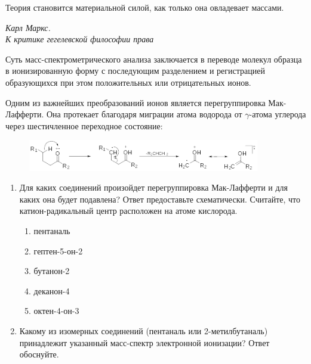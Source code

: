 

\hfill
\begin{minipage}{0.5\textwidth}
  \raggedleft
  Теория становится материальной силой, как только она овладевает массами.

  \textit{Карл Маркс.}\\
  \textit{К критике гегелевской философии права}
\end{minipage}

Суть масс-спектрометрического анализа заключается в переводе молекул образца в ионизированную форму с последующим разделением и регистрацией образующихся при этом положительных или отрицательных ионов.

Одним из важнейших преобразований ионов является перегруппировка
Мак-Лафферти. Она протекает благодаря миграции атома водорода
от $\gamma$-атома углерода через шестичленное переходное состояние:
\nopagebreak
\begin{figure}[H]
  \centering
  \includegraphics[width=0.9\textwidth]{problems/problem3/images/image1}
\end{figure}

\begin{enumerate}
  \item Для каких соединений произойдет перегруппировка Мак-Лафферти и для каких она будет подавлена? Ответ предоставьте схематически. Считайте, что катион-радикальный центр расположен на атоме кислорода.
  \nopagebreak
    \begin{enumerate}
      \item пентаналь
      \item гептен-5-он-2
      \item бутанон-2
      \item деканон-4
      \item октен-4-он-3
    \end{enumerate}

  \item Какому из изомерных соединений (пентаналь или 2-метилбутаналь) принадлежит указанный масс-спектр электронной ионизации? Ответ обоснуйте.
\end{enumerate}

